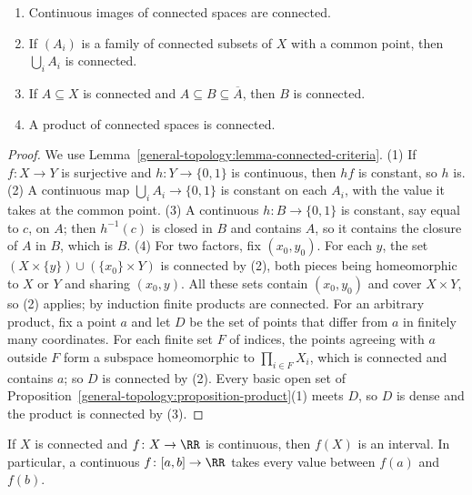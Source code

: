 \begin{proposition}\label{general-topology:proposition-connected-operations}
\begin{enumerate}
\item Continuous images of connected spaces are connected.
\item If $(A_i)$ is a family of connected subsets of $X$ with a common point, then $\bigcup_i A_i$ is connected.
\item If $A \subseteq X$ is connected and $A \subseteq B \subseteq \overline{A}$, then $B$ is connected.
\item A product of connected spaces is connected.
\end{enumerate}
\end{proposition}

\begin{proof}
We use Lemma~\ref{general-topology:lemma-connected-criteria}. (1) If $f \colon X \to Y$ is surjective and $h \colon Y \to \{0,1\}$ is continuous, then
$hf$ is constant, so $h$ is. (2) A continuous map $\bigcup_i A_i \to \{0, 1\}$ is constant on each $A_i$, with the value it takes at the common point.
(3) A continuous $h \colon B \to \{0,1\}$ is constant, say equal to $c$, on $A$; then $h^{-1}(c)$ is closed in $B$ and contains $A$, so it contains the
closure of $A$ in $B$, which is $B$. (4) For two factors, fix $(x_0, y_0)$. For each $y$, the set $(X \times \{y\}) \cup (\{x_0\} \times Y)$ is connected by
(2), both pieces being homeomorphic to $X$ or $Y$ and sharing $(x_0, y)$. All these sets contain $(x_0, y_0)$ and cover $X \times Y$, so (2) applies; by
induction finite products are connected. For an arbitrary product, fix a point $a$ and let $D$ be the set of points that differ from $a$ in finitely
many coordinates. For each finite set $F$ of indices, the points agreeing with $a$ outside $F$ form a subspace homeomorphic to $\prod_{i \in F} X_i$,
which is connected and contains $a$; so $D$ is connected by (2). Every basic open set of
Proposition~\ref{general-topology:proposition-product}(1) meets $D$, so $D$ is dense and the product is connected by (3).
\end{proof}

\begin{corollary}\label{general-topology:corollary-ivt}
If $X$ is connected and $f \colon X \to \RR$ is continuous, then $f(X)$ is an interval. In particular, a continuous $f \colon [a, b] \to \RR$ takes every
value between $f(a)$ and $f(b)$.
\end{corollary}

